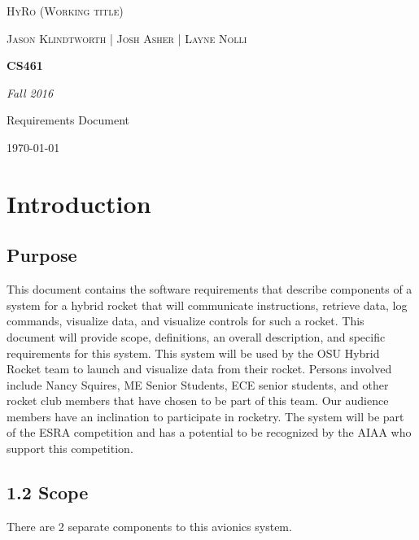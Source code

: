 \documentclass[10pt,draftclsnofoot,onecolumn,compsoc]{IEEEtran}
\begin{document}
\begin{titlepage}
	\centering
	{\scshape\LARGE HyRo (Working title) \par}
	\vspace{1cm}
	{\scshape\Large Jason Klindtworth  |  Josh Asher  |   Layne Nolli\par}
	\vspace{1.5cm}
	{\huge\bfseries CS461\par}
	\vspace{2cm}
	{\Large\itshape Fall 2016\par}
	\vspace{4cm}
	{\large Requirements Document\par}
	\vfill

	{\large \today\par}
\end{titlepage}


\setcounter{tocdepth}{2}
\tableofcontents

\section{ Introduction}
\subsection{Purpose}
  This document contains the software requirements that describe components of a system for a hybrid rocket that will communicate instructions, retrieve data, log commands,
 visualize data, and visualize controls for such a rocket.  This document will provide scope, definitions, an overall description, and specific requirements for this system.
 This system will be used by the OSU Hybrid Rocket team to launch and visualize data from their rocket. Persons involved include Nancy Squires, ME Senior Students, ECE senior students,
 and other rocket club members that have chosen to be part of this team. Our audience members have an inclination to participate in rocketry. The system will be part of the ESRA
competition and has a potential to be recognized by the AIAA who support this competition.
\subsection{1.2 Scope}
 There are 2 separate components to this avionics system. 
\end{document}
